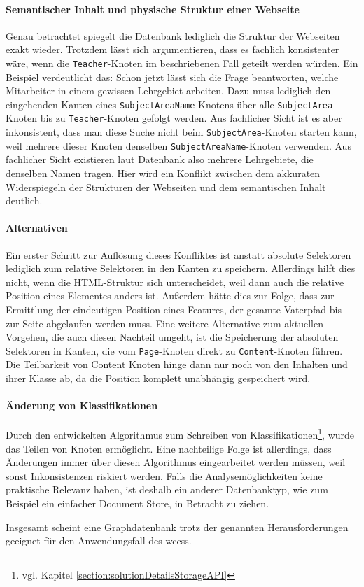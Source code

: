     \paragraph{Semantischer Inhalt und physische Struktur einer Webseite}
    Genau betrachtet spiegelt die Datenbank lediglich die Struktur der Webseiten exakt wieder.
    Trotzdem lässt sich argumentieren, dass es fachlich konsistenter wäre,
    wenn die \texttt{Teacher}-Knoten im beschriebenen Fall geteilt werden würden.
    Ein Beispiel verdeutlicht das:
    Schon jetzt lässt sich die Frage beantworten,
    welche Mitarbeiter in einem gewissen Lehrgebiet arbeiten.
    Dazu muss lediglich den eingehenden Kanten eines
    \texttt{SubjectAreaName}-Knotens über alle \texttt{SubjectArea}-Knoten
    bis zu \texttt{Teacher}-Knoten gefolgt werden.
    Aus fachlicher Sicht ist es aber inkonsistent,
    dass man diese Suche nicht beim \texttt{SubjectArea}-Knoten
    starten kann, weil mehrere dieser Knoten denselben
    \texttt{SubjectAreaName}-Knoten verwenden.
    Aus fachlicher Sicht existieren laut Datenbank also mehrere Lehrgebiete,
    die denselben Namen tragen.
    Hier wird ein Konflikt zwischen dem akkuraten Widerspiegeln der Strukturen der Webseiten
    und dem semantischen Inhalt deutlich.

    \paragraph{Alternativen}
    Ein erster Schritt zur Auflösung dieses Konfliktes ist anstatt absolute Selektoren
    lediglich zum {\parentFeature} relative Selektoren in den Kanten zu speichern.
    Allerdings hilft dies nicht, wenn die HTML-Struktur sich unterscheidet,
    weil dann auch die relative Position eines Elementes anders ist.
    Außerdem hätte dies zur Folge, dass zur Ermittlung der eindeutigen Position
    eines Features, der gesamte Vaterpfad bis zur Seite abgelaufen werden muss.
    Eine weitere Alternative zum aktuellen Vorgehen,
    die auch diesen Nachteil umgeht,
    ist die Speicherung der absoluten Selektoren in Kanten,
    die vom \texttt{Page}-Knoten direkt zu \texttt{Content}-Knoten führen.
    Die Teilbarkeit von Content Knoten hinge dann nur noch von den Inhalten und ihrer Klasse ab,
    da die Position komplett unabhängig gespeichert wird.

    \paragraph{Änderung von Klassifikationen}
    Durch den entwickelten Algorithmus zum Schreiben von Klassifikationen\footnote{vgl. Kapitel \ref{section:solutionDetailsStorageAPI}},
    wurde das Teilen von Knoten ermöglicht.
    Eine nachteilige Folge ist allerdings,
    dass Änderungen immer über diesen Algorithmus eingearbeitet werden müssen,
    weil sonst Inkonsistenzen riskiert werden.
    Falls die Analysemöglichkeiten keine praktische Relevanz haben,
    ist deshalb ein anderer Datenbanktyp, wie zum Beispiel ein einfacher Document Store,
    in Betracht zu ziehen.

    Insgesamt scheint eine Graphdatenbank trotz der genannten Herausforderungen geeignet
    für den Anwendungsfall des \glspl{wccs}.
